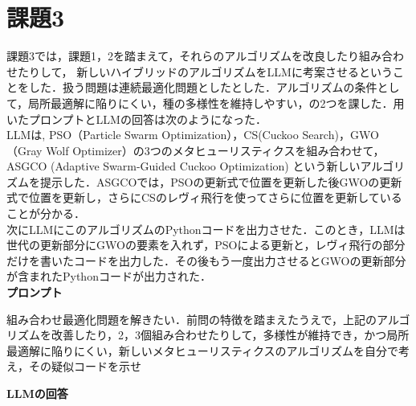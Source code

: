 \documentclass[a4paper]{ltjsarticle}
\begin{document}
\section{課題3}
課題3では，課題1，2を踏まえて，それらのアルゴリズムを改良したり組み合わせたりして， 新しいハイブリッドのアルゴリズムをLLMに考案させるということをした．扱う問題は連続最適化問題としたとした．アルゴリズムの条件として，局所最適解に陥りにくい，種の多様性を維持しやすい，の2つを課した．用いたプロンプトとLLMの回答は次のようになった．\\\quad
LLMは, PSO（Particle Swarm Optimization），CS(Cuckoo Search)，GWO（Gray Wolf Optimizer）の3つのメタヒューリスティクスを組み合わせて， ASGCO (Adaptive Swarm-Guided Cuckoo Optimization) という新しいアルゴリズムを提示した．ASGCOでは，PSOの更新式で位置を更新した後GWOの更新式で位置を更新し，さらにCSのレヴィ飛行を使ってさらに位置を更新していることが分かる．\\
次にLLMにこのアルゴリズムのPythonコードを出力させた．このとき，LLMは世代の更新部分にGWOの要素を入れず，PSOによる更新と，レヴィ飛行の部分だけを書いたコードを出力した．その後もう一度出力させるとGWOの更新部分が含まれたPythonコードが出力された．
\\\noindent
\textbf{プロンプト}
\begin{tcolorbox}[arc=6mm, enhanced, borderline={0.5mm}{0mm}{black}, breakable, colback = white]
    組み合わせ最適化問題を解きたい．前問の特徴を踏まえたうえで，上記のアルゴリズムを改善したり，2，3個組み合わせたりして，多様性が維持でき，かつ局所最適解に陥りにくい，新しいメタヒューリスティクスのアルゴリズムを自分で考え，その疑似コードを示せ
\end{tcolorbox}
\noindent
\textbf{LLMの回答}
\end{document}
